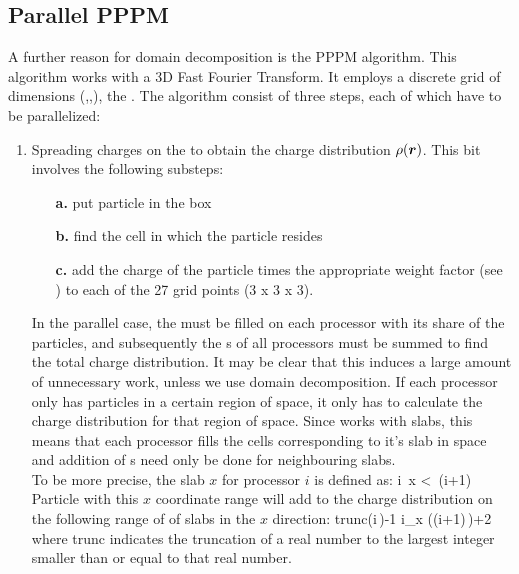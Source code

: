 \subsection{Parallel PPPM}
A further reason for domain decomposition is the PPPM algorithm. This algorithm
works with a 3D Fast Fourier Transform. It employs a discrete grid of dimensions
(\nx,\ny,\nz), the {\fftgrid}. The algorithm consist of three steps,
each of which have to be parallelized:
\begin{enumerate}
\item	Spreading charges on the {\fftgrid} to obtain the charge 
	distribution $\rho(\mbox{\boldmath ${r}$})$.
	This bit involves the following substeps:
	\begin{enumerate}
	\item[{\bf a.}] put particle in the box
	\item[{\bf b.}] find the {\fftgrid} cell in which the particle resides
	\item[{\bf c.}] add the charge of the particle times the appropriate
			weight factor (see ) to 
			each of the 27 grid points (3 x 3 x 3).
	\end{enumerate}
	In the parallel case, the {\fftgrid} 
	must be filled on each processor with its
	share of the particles, and subsequently the {\fftgrid}s of all processors
	must be summed to find the total charge distribution. It may be clear that
	this induces a large amount of unnecessary work, unless we use domain
	decomposition. If each processor only has particles in a certain region
	of space, it only has to calculate the charge distribution for 
	that region of space. Since {\gromacs} works with slabs, this means that
	each processor fills the {\fftgrid} cells corresponding to it's slab in space
	and addition of {\fftgrid}s need only be done for neighbouring slabs.\\
	To be more precise, the slab $x$ for processor $i$ is defined as:
	\beq
	i\,  \le x <\, (i+1)
	\eeq
	Particle with this $x$ coordinate range will add to the charge distribution
	on the following range of 
	of {\fftgrid} slabs in the $x$ direction:
	\beq
	{\rm trunc}\left(i\,\right)-1 \le i_x \left((i+1)\,\right)+2
	\eeq
	where trunc indicates the truncation of a real number to the largest integer
	smaller than or equal to that real number.
	

\end{enumerate}
